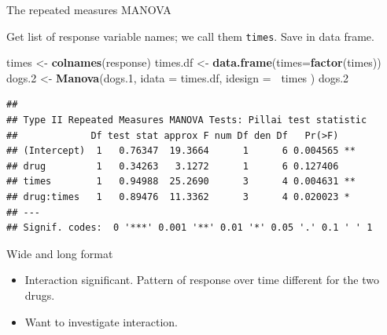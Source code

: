 \documentclass[
  ignorenonframetext,
]{beamer}
\newenvironment{Shaded}{\begin{snugshade}}{\end{snugshade}}
\newcommand{\DataTypeTok}[1]{\textcolor[rgb]{0.13,0.29,0.53}{#1}}
\newcommand{\FloatTok}[1]{\textcolor[rgb]{0.00,0.00,0.81}{#1}}
\newcommand{\KeywordTok}[1]{\textcolor[rgb]{0.13,0.29,0.53}{\textbf{#1}}}
\newcommand{\NormalTok}[1]{#1}
\newcommand{\OperatorTok}[1]{\textcolor[rgb]{0.81,0.36,0.00}{\textbf{#1}}}
\newcommand{\StringTok}[1]{\textcolor[rgb]{0.31,0.60,0.02}{#1}}
\begin{document}
\begin{frame}[fragile]{The repeated measures MANOVA}
\protect\hypertarget{the-repeated-measures-manova}{}

Get list of response variable names; we call them \texttt{times}. Save
in data frame.

\footnotesize

\begin{Shaded}
\begin{Highlighting}[]
\NormalTok{times <-}\StringTok{ }\KeywordTok{colnames}\NormalTok{(response)}
\NormalTok{times.df <-}\StringTok{ }\KeywordTok{data.frame}\NormalTok{(}\DataTypeTok{times=}\KeywordTok{factor}\NormalTok{(times))}
\NormalTok{dogs}\FloatTok{.2}\NormalTok{ <-}\StringTok{ }\KeywordTok{Manova}\NormalTok{(dogs}\FloatTok{.1}\NormalTok{,}
  \DataTypeTok{idata =}\NormalTok{ times.df,}
  \DataTypeTok{idesign =} \OperatorTok{~}\NormalTok{times}
\NormalTok{)}
\NormalTok{dogs}\FloatTok{.2}
\end{Highlighting}
\end{Shaded}

\begin{verbatim}
## 
## Type II Repeated Measures MANOVA Tests: Pillai test statistic
##             Df test stat approx F num Df den Df   Pr(>F)   
## (Intercept)  1   0.76347  19.3664      1      6 0.004565 **
## drug         1   0.34263   3.1272      1      6 0.127406   
## times        1   0.94988  25.2690      3      4 0.004631 **
## drug:times   1   0.89476  11.3362      3      4 0.020023 * 
## ---
## Signif. codes:  0 '***' 0.001 '**' 0.01 '*' 0.05 '.' 0.1 ' ' 1
\end{verbatim}

\normalsize

\end{frame}

\begin{frame}{Wide and long format}
\protect\hypertarget{wide-and-long-format}{}

\begin{itemize}
\item
  Interaction significant. Pattern of response over time different for
  the two drugs.
\item
  Want to investigate interaction.
\end{itemize}

\end{frame}
\end{document}
